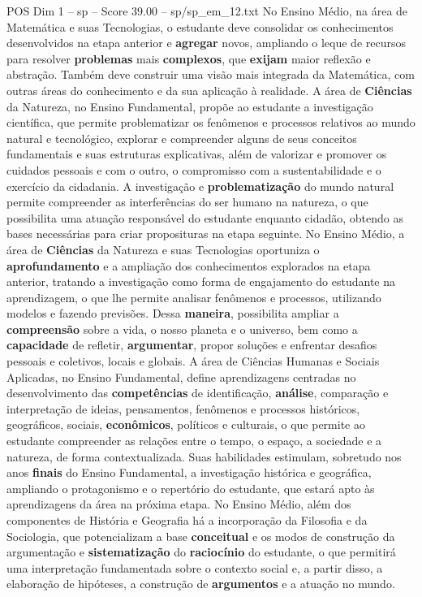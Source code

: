 \begin{textsample}{POS Dim 1 – sp – Score 39.00 – sp/sp\_em\_12.txt}
No Ensino Médio, na área de Matemática e suas Tecnologias, o estudante deve consolidar os conhecimentos desenvolvidos na etapa anterior e \textbf{agregar} novos, ampliando o leque de recursos para resolver \textbf{problemas} mais \textbf{complexos}, que \textbf{exijam} maior reflexão e abstração.
Também deve construir uma visão mais integrada da Matemática, com outras áreas do conhecimento e da sua aplicação à realidade.
A área de \textbf{Ciências} da Natureza, no Ensino Fundamental, propõe ao estudante a investigação científica, que permite problematizar os fenômenos e processos relativos ao mundo natural e tecnológico, explorar e compreender alguns de seus conceitos fundamentais e suas estruturas explicativas, além de valorizar e promover os cuidados pessoais e com o outro, o compromisso com a sustentabilidade e o exercício da cidadania.
A investigação e \textbf{problematização} do mundo natural permite compreender as interferências do ser humano na natureza, o que possibilita uma atuação responsável do estudante enquanto cidadão, obtendo as bases necessárias para criar proposituras na etapa seguinte.
No Ensino Médio, a área de \textbf{Ciências} da Natureza e suas Tecnologias oportuniza o \textbf{aprofundamento} e a ampliação dos conhecimentos explorados na etapa anterior, tratando a investigação como forma de engajamento do estudante na aprendizagem, o que lhe permite analisar fenômenos e processos, utilizando modelos e fazendo previsões.
Dessa \textbf{maneira}, possibilita ampliar a \textbf{compreensão} sobre a vida, o nosso planeta e o universo, bem como a \textbf{capacidade} de refletir, \textbf{argumentar}, propor soluções e enfrentar desafios pessoais e coletivos, locais e globais.
A área de Ciências Humanas e Sociais Aplicadas, no Ensino Fundamental, define aprendizagens centradas no desenvolvimento das \textbf{competências} de identificação, \textbf{análise}, comparação e interpretação de ideias, pensamentos, fenômenos e processos históricos, geográficos, sociais, \textbf{econômicos}, políticos e culturais, o que permite ao estudante compreender as relações entre o tempo, o espaço, a sociedade e a natureza, de forma contextualizada.
Suas habilidades estimulam, sobretudo nos anos \textbf{finais} do Ensino Fundamental, a investigação histórica e geográfica, ampliando o protagonismo e o repertório do estudante, que estará apto às aprendizagens da área na próxima etapa.
No Ensino Médio, além dos componentes de História e Geografia há a incorporação da Filosofia e da Sociologia, que potencializam a base \textbf{conceitual} e os modos de construção da argumentação e \textbf{sistematização} do \textbf{raciocínio} do estudante, o que permitirá uma interpretação fundamentada sobre o contexto social e, a partir disso, a elaboração de hipóteses, a construção de \textbf{argumentos} e a atuação no mundo.

\end{textsample}

